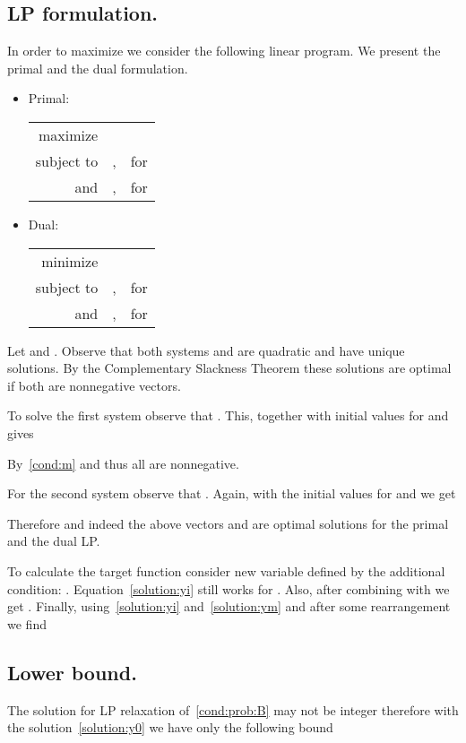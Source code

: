 \documentclass[12pt]{amsart}
\theoremstyle{definition}
\begin{document}
\subsection{LP formulation.}
In order to maximize  we consider the following linear program. We present the primal and the dual formulation.
\begin{itemize}
 \item Primal:
 
 \begin{tabular}{rll}
  maximize    & \\
  subject to  &  , & for \\
  and         &  , & for 
 \end{tabular}

 \item Dual:
 
 \begin{tabular}{rll}
  minimize    & \\
  subject to  &  , & for \\
  and         &  , & for 
 \end{tabular}
\end{itemize}
Let  and . 
Observe that both systems  and  are quadratic and have unique solutions. 
By the Complementary Slackness Theorem these solutions are optimal if both are nonnegative vectors.

To solve the first system observe that . 
This, together with initial values for  and  gives 

By~\eqref{cond:m}  and thus all  are nonnegative.

For the second system observe that . Again, with the initial values for  and  we get

Therefore  and indeed the above vectors  and  are optimal solutions for the primal and the dual LP.

To calculate the target function  consider new variable  defined by the additional condition: .
Equation~\eqref{solution:yi} still works for . 
Also, after combining  with  we get .
Finally, using~\eqref{solution:yi} and~\eqref{solution:ym} and after some rearrangement we find 


 


\subsection{Lower bound.}
The solution for LP relaxation of~\eqref{cond:prob:B} may not be integer therefore with the solution~\eqref{solution:y0} we have only the following bound
\end{document}

